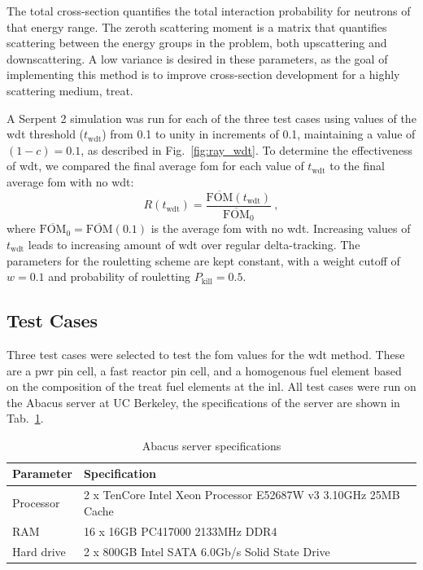 The total cross-section quantifies the total interaction probability
for neutrons of that energy range. The zeroth scattering moment is a
matrix that quantifies scattering between the energy groups in the
problem, both upscattering and downscattering. A low variance is
desired in these parameters, as the goal of implementing this method
is to improve cross-section development for a highly scattering
medium, \gls{treat}.

A Serpent 2 simulation was run for each of the three test cases using
values of the \gls{wdt} threshold ($t_\mathrm{wdt}$) from 0.1 to unity in increments of
0.1, maintaining a value of $(1-c) = 0.1$, as described in
Fig.~\ref{fig:ray_wdt}. To determine the effectiveness of \gls{wdt},
we compared the final average \gls{fom} for each value of
$t_{\mathrm{wdt}}$ to the final average \gls{fom} with no \gls{wdt}:
\begin{equation*}
  R(t_{\mathrm{wdt}}) =
  \frac{\overline{\mathrm{FOM}}(t_\mathrm{wdt})}{\overline{\mathrm{FOM}}_0}\:,
\end{equation*}
where $\overline{\mathrm{FOM}}_0 =
\overline{\mathrm{FOM}}(0.1)$ is
the average \gls{fom} with no \gls{wdt}. Increasing values of
$t_{\mathrm{wdt}}$ leads to increasing amount of \gls{wdt} over
regular delta-tracking. The parameters for the rouletting scheme are
kept constant, with a weight cutoff of $w = 0.1$ and probability of
rouletting $P_{\mathrm{kill}} = 0.5$.

\subsection{Test Cases}
\label{sec:test_cases}

Three test cases were selected to test the \gls{fom} values for the
\gls{wdt} method. These are a \gls{pwr} pin cell, a fast reactor pin
cell, and a homogenous fuel element based on the composition of the
\gls{treat} fuel elements at the \gls{inl}. All test cases were run on
the Abacus server at UC Berkeley, the specifications of the server are
shown in Tab.~\ref{tab:abacus}.
\begin{table}[hbtp]
  \centering
  \caption{Abacus server specifications}
  \begin{tabular}{ll}
    \toprule
    \textrm{Parameter} & \textrm{Specification} \\ \midrule
    Processor & 2 x TenCore Intel Xeon Processor E5­2687W v3 3.10GHz
                 25MB Cache \\
    RAM & 16 x 16GB PC4­17000 2133MHz DDR4 \\
    Hard drive & 2 x 800GB Intel SATA 6.0Gb/s Solid State Drive
          \\ \bottomrule
  \end{tabular}
  \label{tab:abacus}
\end{table}

